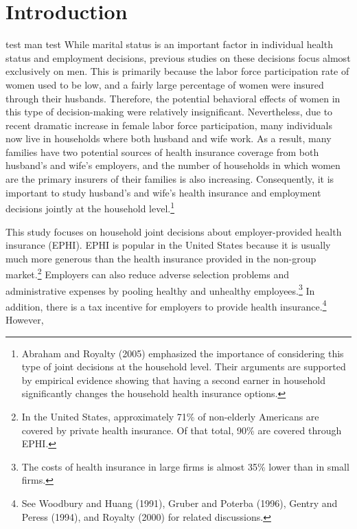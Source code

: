 \documentclass[legno,11pt]{article}
\begin{document}


\newpage
\section{Introduction}\label{section1}
test man test
While marital status is an important factor in individual health
status and employment decisions, previous studies on these decisions
focus almost exclusively on men. This is primarily because the labor
force participation rate of women used to be low, and a fairly large
percentage of women were insured through their husbands. Therefore,
the potential behavioral effects of women in this type of
decision-making were relatively insignificant. Nevertheless, due to
recent dramatic increase in female labor force participation, many
individuals now live in households where both husband and wife work.
As a result, many families have two potential sources of health
insurance coverage from both husband's and wife's employers, and the
number of households in which women are the primary insurers of
their families is also increasing. Consequently, it is important to
study husband's and wife's health insurance and employment decisions
jointly at the household level.\footnote{Abraham and Royalty (2005)
emphasized the importance of considering this type of joint
decisions at the household level. Their arguments are supported by
empirical evidence showing that having a second earner in household
significantly changes the household health insurance options. }
\par
This study focuses on household joint decisions about
employer-provided health insurance (EPHI). EPHI is popular in the
United States because it is usually much more generous than the
health insurance provided in the non-group market.\footnote{In the
United States, approximately 71\% of non-elderly Americans are
covered by private health insurance. Of that total, 90\% are covered
through EPHI.} Employers can also reduce adverse selection problems
and administrative expenses by pooling healthy and unhealthy
employees.\footnote{The costs of health insurance in large firms is
almost 35\% lower than in small firms.} In addition, there is a tax
incentive for employers to provide health insurance.\footnote{See
Woodbury and Huang (1991), Gruber and Poterba (1996), Gentry and
Peress (1994), and Royalty (2000) for related discussions.} However,
\end{document}
